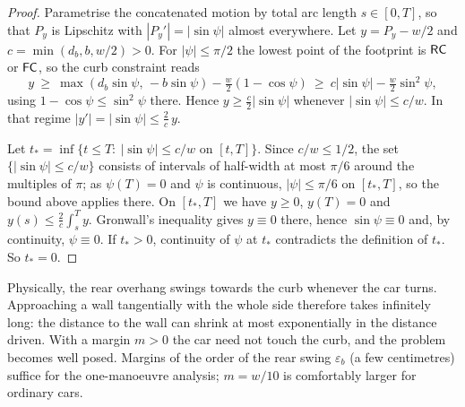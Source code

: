 \begin{proof}
Parametrise the concatenated motion by total arc length $s\in[0,T]$, so that $P_y$ is Lipschitz with $|P_y'|=|\sin\psi|$ almost everywhere.
Let $y=P_y-w/2$ and $c=\min(d_b,b,w/2)>0$.
For $|\psi|\le\pi/2$ the lowest point of the footprint is $\mathsf{RC}$ or $\mathsf{FC}$, so the curb constraint reads
\[
  y\ \ge\ \max(d_b\sin\psi,\,-b\sin\psi)-\tfrac w2(1-\cos\psi)\ \ge\ c|\sin\psi|-\tfrac w2\sin^2\psi ,
\]
using $1-\cos\psi\le\sin^2\psi$ there.
Hence $y\ge\frac c2|\sin\psi|$ whenever $|\sin\psi|\le c/w$.
In that regime $|y'|=|\sin\psi|\le\frac2c\,y$.

Let $t_*=\inf\{t\le T:\ |\sin\psi|\le c/w\text{ on }[t,T]\}$.
Since $c/w\le1/2$, the set $\{|\sin\psi|\le c/w\}$ consists of intervals of half-width at most $\pi/6$ around the multiples of $\pi$; as $\psi(T)=0$ and $\psi$ is continuous, $|\psi|\le\pi/6$ on $[t_*,T]$, so the bound above applies there.
On $[t_*,T]$ we have $y\ge0$, $y(T)=0$ and $y(s)\le\frac2c\int_s^Ty$.
Gronwall's inequality gives $y\equiv0$ there, hence $\sin\psi\equiv0$ and, by continuity, $\psi\equiv0$.
If $t_*>0$, continuity of $\psi$ at $t_*$ contradicts the definition of $t_*$.
So $t_*=0$.
\end{proof}

Physically, the rear overhang swings towards the curb whenever the car turns.
Approaching a wall tangentially with the whole side therefore takes infinitely long: the distance to the wall can shrink at most exponentially in the distance driven.
With a margin $m>0$ the car need not touch the curb, and the problem becomes well posed.
Margins of the order of the rear swing $\varepsilon_b$ (a few centimetres) suffice for the one-manoeuvre analysis; $m=w/10$ is comfortably larger for ordinary cars.
